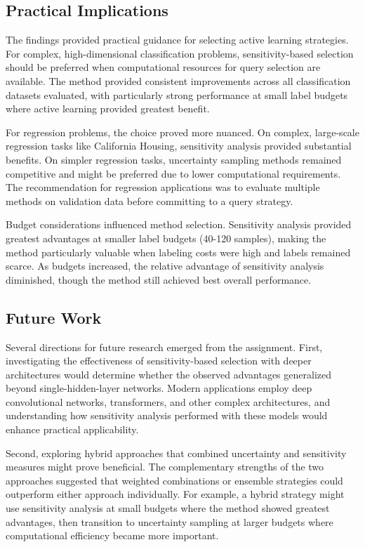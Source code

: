 \documentclass[conference]{IEEEtran}
\begin{document}
\subsection{Practical Implications}

The findings provided practical guidance for selecting active learning strategies. For complex, high-dimensional classification problems, sensitivity-based selection should be preferred when computational resources for query selection are available. The method provided consistent improvements across all classification datasets evaluated, with particularly strong performance at small label budgets where active learning provided greatest benefit.

For regression problems, the choice proved more nuanced. On complex, large-scale regression tasks like California Housing, sensitivity analysis provided substantial benefits. On simpler regression tasks, uncertainty sampling methods remained competitive and might be preferred due to lower computational requirements. The recommendation for regression applications was to evaluate multiple methods on validation data before committing to a query strategy.

Budget considerations influenced method selection. Sensitivity analysis provided greatest advantages at smaller label budgets (40-120 samples), making the method particularly valuable when labeling costs were high and labels remained scarce. As budgets increased, the relative advantage of sensitivity analysis diminished, though the method still achieved best overall performance.

\subsection{Future Work}

Several directions for future research emerged from the assignment. First, investigating the effectiveness of sensitivity-based selection with deeper architectures would determine whether the observed advantages generalized beyond single-hidden-layer networks. Modern applications employ deep convolutional networks, transformers, and other complex architectures, and understanding how sensitivity analysis performed with these models would enhance practical applicability.

Second, exploring hybrid approaches that combined uncertainty and sensitivity measures might prove beneficial. The complementary strengths of the two approaches suggested that weighted combinations or ensemble strategies could outperform either approach individually. For example, a hybrid strategy might use sensitivity analysis at small budgets where the method showed greatest advantages, then transition to uncertainty sampling at larger budgets where computational efficiency became more important.
\end{document}
